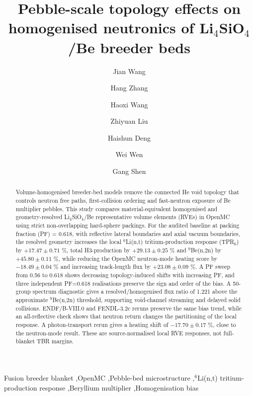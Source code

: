 \documentclass[preprint,12pt]{elsarticle}
\begin{document}
\begin{frontmatter}

\title{Pebble-scale topology effects on homogenised neutronics of Li$_4$SiO$_4$/Be breeder beds}

\author[a,b]{Jian Wang}
\author[a]{Hang Zhang}
\author[a]{Haoxi Wang}
\author[a]{Zhiyuan Liu}
\author[a]{Haishun Deng}
\author[a,b]{Wei Wen}
\author[a]{Gang Shen}

\address[a]{Anhui University of Science and Technology, Huainan, Anhui, China}
\address[b]{Institute of Plasma Physics, Hefei Institutes of Physical Science, Chinese Academy of Sciences, Hefei, Anhui, China}

\begin{abstract}
Volume-homogenised breeder-bed models remove the connected He void topology
that controls neutron free paths, first-collision ordering and fast-neutron
exposure of Be multiplier pebbles.  This study compares material-equivalent
homogenised and geometry-resolved Li$_4$SiO$_4$/Be representative volume
elements (RVEs) in OpenMC using strict non-overlapping hard-sphere packings.
For the audited baseline at packing fraction (PF) = 0.618, with reflective
lateral boundaries and axial vacuum boundaries, the resolved geometry increases
the local $^6$Li(n,t) tritium-production response (TPR$_6$) by
$+17.47\pm0.71$ \%, total H3-production by $+29.13\pm0.25$ \% and
$^9$Be(n,2n) by $+45.80\pm0.11$ \%, while reducing the OpenMC neutron-mode
heating score by $-18.49\pm0.04$ \% and increasing track-length flux by
$+23.08\pm0.09$ \%.  A PF sweep from 0.56 to 0.618 shows decreasing
topology-induced shifts with increasing PF, and three independent PF=0.618
realisations preserve the sign and order of the bias.  A 50-group spectrum
diagnostic gives a resolved/homogenised flux ratio of 1.221 above the
approximate $^9$Be(n,2n) threshold, supporting void-channel streaming and
delayed solid collisions.  ENDF/B-VIII.0 and FENDL-3.2c reruns preserve the
same bias trend, while an all-reflective check shows that neutron return
changes the partitioning of the local response.  A photon-transport rerun gives
a heating shift of $-17.70\pm0.17$ \%, close to the neutron-mode result.  These
are source-normalised local RVE responses, not full-blanket TBR margins.
\end{abstract}

\begin{keyword}
Fusion breeder blanket \sep OpenMC \sep Pebble-bed microstructure \sep $^6$Li(n,t) tritium-production response \sep Beryllium multiplier \sep Homogenisation bias
\end{keyword}

\end{frontmatter}
\end{document}
